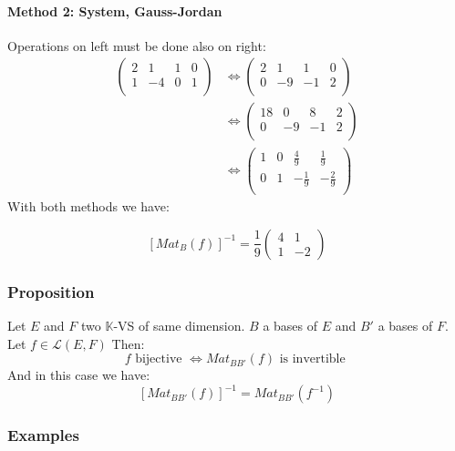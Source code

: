 \documentclass[notitlepage]{math}
\begin{document}
\paragraph{Method 2: System, Gauss-Jordan}


Operations on left must be done also on right:
\begin{align*}
    \left( \begin{array}{cc|cc}
        2 & 1 & 1 &  0 \\
        1 & -4 & 0 & 1 \\
    \end{array}\right)  & \Longleftrightarrow 
    \left( \begin{array}{cc|cc}
        2 & 1 & 1 &  0 \\
        0 & -9 & -1 & 2 \\
    \end{array}\right) \\
    &\Longleftrightarrow 
    \left( \begin{array}{cc|cc}
        18 & 0 & 8 &  2 \\
        0 & -9 & -1 & 2 \\
    \end{array}\right)  \\
    &\Longleftrightarrow 
    \left( \begin{array}{cc|cc}
        1 & 0 & \frac{4}{9} &  \frac{1}{9} \\
        0 & 1 & -\frac{1}{9} & -\frac{2}{9} \\
    \end{array}\right) 
\end{align*}
With both methods we have:
    
    
    \[ \left[ Mat_{B}(f) \right]^{-1} = \frac{1}{9} \begin{pmatrix} 4& 1 \\ 1 & -2 \end{pmatrix} \]
    
    


\subsubsection{Proposition}
Let $E$ and $F$ two $\mathbb{K}$-VS of same dimension. $B$ a bases of $E$ and $B'$ a bases of $F$. Let $f \in \mathcal{L}(E,F)$ Then:
\[ f \text{ bijective } \Longleftrightarrow Mat_{BB'}(f) \text{ is invertible }\]
And in this case we have:
\[ \left[Mat_{BB'}(f)\right]^{-1} = Mat_{BB'}(f^{-1})\]
\subsubsection{Examples}
\end{document}
